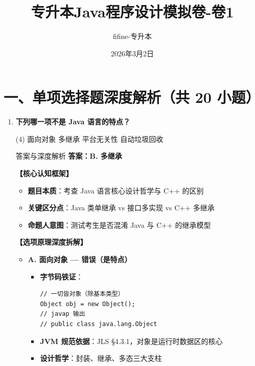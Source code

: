 ﻿\documentclass[12pt, a4paper]{ctexart}
\begin{document}
\title{\textcolor{myblue}{\textbf{专升本Java程序设计模拟卷-卷1}}}
\author{fifine-专升本}
\date{2026年3月2日}
\maketitle
\thispagestyle{empty}
\newpage

\section*{一、单项选择题深度解析（共 20 小题）}

\begin{enumerate}[label=\textbf{\arabic*.}, itemsep=1em]
	\item \textbf{下列哪一项不是 Java 语言的特点？}
	      \begin{tasks}(4)
		      \task 面向对象 \task 多继承 \task 平台无关性 \task 自动垃圾回收
	      \end{tasks}

	      \begin{bluebox}{答案与深度解析}
		      \textbf{答案：B. 多继承}

		      \textbf{【核心认知框架】}
		      \begin{itemize}[leftmargin=*, nosep]
			      \item \textbf{题目本质}：考查 Java 语言核心设计哲学与 C++ 的区别
			      \item \textbf{关键区分点}：Java 类单继承 vs 接口多实现 vs C++ 多继承
			      \item \textbf{命题人意图}：测试考生是否混淆 Java 与 C++ 的继承模型
		      \end{itemize}

		      \textbf{【选项原理深度拆解】}
		      \begin{itemize}[leftmargin=*, nosep]
			      \item \textbf{A. 面向对象 — 错误（是特点）}
			            \begin{itemize}[leftmargin=*, nosep]
				            \item \textbf{字节码铁证}：
				                  \begin{lstlisting}[style=JavaExam]
// 一切皆对象（除基本类型）
Object obj = new Object();
// javap 输出
// public class java.lang.Object
            \end{lstlisting}
				            \item \textbf{JVM 规范依据}：JLS §4.3.1，对象是运行时数据区的核心
				            \item \textbf{设计哲学}：封装、继承、多态三大支柱
			            \end{itemize}


\end{itemize}
\end{bluebox}
\end{enumerate}
\end{document}
